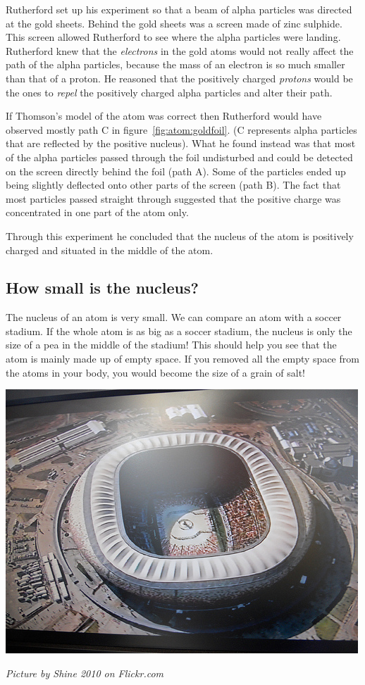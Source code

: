 \label{m38756*id254715}Rutherford set up his experiment so that a beam of alpha particles was directed at the gold sheets. Behind the gold sheets was a screen made of zinc sulphide. This screen allowed Rutherford to see where the alpha particles were landing. Rutherford knew that the \textsl{electrons} in the gold atoms would not really affect the path of the alpha particles, because the mass of an electron is so much smaller than that of a proton. He reasoned that the positively charged \textsl{protons} would be the ones to \textsl{repel} the positively charged alpha particles and alter their path.\par 
If Thomson's model of the atom was correct then Rutherford would have observed mostly path C in figure~\ref{fig:atom:goldfoil}. (C represents alpha particles that are reflected by the positive nucleus). What he found instead was that most of the alpha particles passed through the foil undisturbed and could be detected on the screen directly behind the foil (path A). Some of the particles ended up being slightly deflected onto other parts of the screen (path B).  The fact that most particles passed straight through suggested that the positive charge was concentrated in one part of the atom only.\par 
Through this experiment he concluded that the nucleus of the atom is positively charged and situated in the middle of the atom.
\subsection*{How small is the nucleus?}
\begin{minipage}{.5\textwidth}
The nucleus of an atom is very small. We can compare an atom with a soccer stadium. If the whole atom is as big as a soccer stadium, the nucleus is only the size of a pea in the middle of the stadium! This should help you see that the atom is mainly made up of empty space. If you removed all the empty space from the atoms in your body, you would become the size of a grain of salt!
\end{minipage}
\begin{minipage}{.5\textwidth}
\begin{center}
 \includegraphics[width=.4\textwidth]{photos/stadiumby-shine2010-flickr.jpg}\par
\textit{Picture by Shine 2010 on Flickr.com}
\end{center}
\end{minipage}
      \label{m38756*eip-491}
